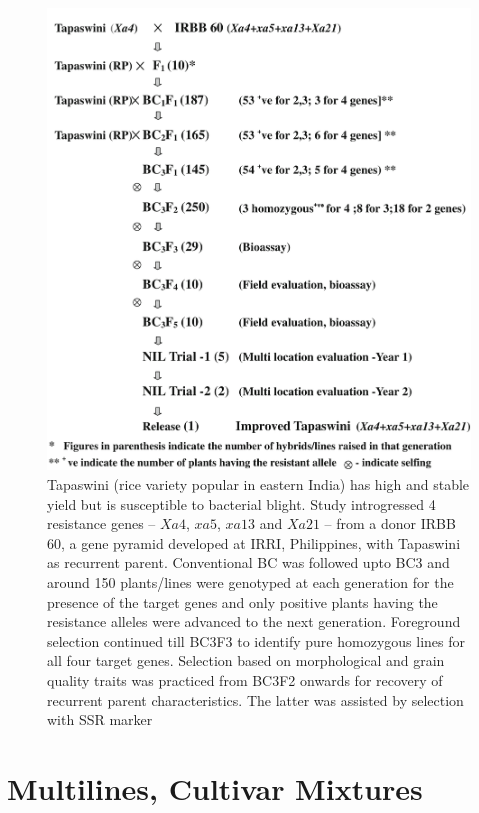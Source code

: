 \documentclass[11pt,dvipsnames,ignorenonframetext,aspectratio=169]{beamer}
\begin{document}
\begin{frame}{}
\protect\hypertarget{section-7}{}
\begin{figure}
\includegraphics[width=0.38\linewidth]{../images/gene_pyramiding_rice_blast} \caption{Tapaswini (rice variety popular in eastern India) has high and stable yield but is susceptible to bacterial blight. Study introgressed 4 resistance genes -- $Xa4$, $xa5$, $xa13$ and $Xa21$ -- from a donor IRBB 60, a gene pyramid developed at IRRI, Philippines, with Tapaswini as recurrent parent. Conventional BC was followed upto BC3 and around 150 plants/lines were genotyped at each generation for the presence of the target genes and only positive plants having the resistance alleles were advanced to the next generation. Foreground selection continued till BC3F3 to identify pure homozygous lines for all four target genes. Selection based on morphological and grain quality traits was practiced from BC3F2 onwards for recovery of recurrent parent characteristics. The latter was assisted by selection with SSR marker}\label{fig:gene-pyramiding-rice-blast}
\end{figure}
\end{frame}

\hypertarget{multilines-cultivar-mixtures}{%
\section{Multilines, Cultivar
Mixtures}\label{multilines-cultivar-mixtures}}
\end{document}

